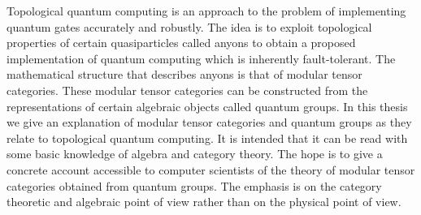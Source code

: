 Topological quantum computing is an approach to the problem of implementing
quantum gates accurately and robustly. The idea is to exploit topological
properties of certain quasiparticles called anyons to obtain a proposed
implementation of quantum computing which is inherently fault-tolerant. The
mathematical structure that describes anyons is that of modular tensor
categories. These modular tensor categories can be constructed from the
representations of certain algebraic objects called quantum groups. In this
thesis we give an explanation of modular tensor categories and quantum groups
as they relate to topological quantum computing. It is intended that it can be
read with some basic knowledge of algebra and category theory.  The hope is to
give a concrete account accessible to computer scientists of the theory of
modular tensor categories obtained from quantum groups. The emphasis is on the
category theoretic and algebraic point of view rather than on the physical
point of view. 
